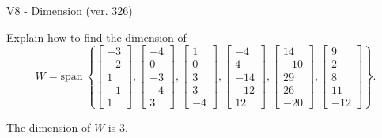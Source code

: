 \begin{exercise}
  \begin{exerciseTitle}V8 - Dimension (ver. 326)\end{exerciseTitle}
  \begin{exerciseStatement}
    Explain how to find the dimension of 
\[W=\mathrm{span}\ \left\{\left[\begin{array}{r}
-3 \\
-2 \\
1 \\
-1 \\
1
\end{array}\right] , \left[\begin{array}{r}
-4 \\
0 \\
-3 \\
-4 \\
3
\end{array}\right] , \left[\begin{array}{r}
1 \\
0 \\
3 \\
3 \\
-4
\end{array}\right] , \left[\begin{array}{r}
-4 \\
4 \\
-14 \\
-12 \\
12
\end{array}\right] , \left[\begin{array}{r}
14 \\
-10 \\
29 \\
26 \\
-20
\end{array}\right] , \left[\begin{array}{r}
9 \\
2 \\
8 \\
11 \\
-12
\end{array}\right]\right\}.\]



  \end{exerciseStatement}
  \begin{exerciseAnswer}
   The dimension of \(W\) is  \(3\).
  


  \end{exerciseAnswer}
\end{exercise}